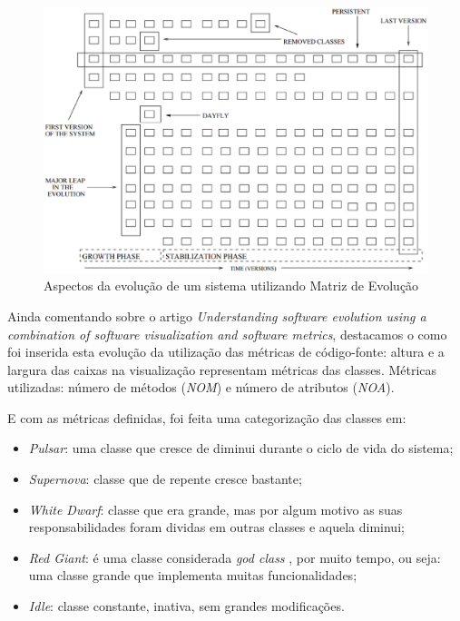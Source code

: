 \begin{figure}[!htb]
  \centering
    \includegraphics[keepaspectratio=true,scale=0.5]
    {figuras/evolutionMatrixAspects.eps}
  \caption{Aspectos da evolução de um sistema utilizando Matriz de Evolução
  \cite{ducasseunderstanding}}
  \label{fig:evolutionMatrixAspects}
\end{figure}


Ainda comentando sobre o artigo \textit{Understanding software evolution using
a combination of software visualization and software metrics}, destacamos o
como foi inserida esta evolução da utilização das métricas de código-fonte:
altura e a largura das caixas na visualização representam métricas das
classes. Métricas utilizadas: número de métodos (\textit{NOM}) e número de
atributos (\textit{NOA}).

E com as métricas definidas, foi feita uma categorização das classes em:

\begin{itemize}
  \item \textit{Pulsar}: uma classe que cresce de diminui durante o ciclo de
  vida do sistema;
  \item \textit{Supernova}: classe que de repente cresce bastante;
  \item \textit{White Dwarf}: classe que era grande, mas por algum motivo as
  suas responsabilidades foram dividas em outras classes e aquela diminui;
  \item \textit{Red Giant}: é uma classe considerada \textit{god class}
  \cite{riel1996object}, por muito tempo, ou seja: uma classe grande que
  implementa muitas funcionalidades;
  \item \textit{Idle}: classe constante, inativa, sem grandes modificações.
\end{itemize}


